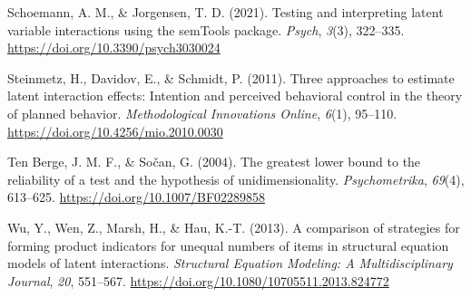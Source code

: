 \documentclass[
  man]{apa6}
\newlength{\cslhangindent}
\newenvironment{CSLReferences}[2] %
 {\begin{list}{}{%
  \setlength{\itemindent}{0pt}
  \setlength{\leftmargin}{0pt}
  \setlength{\parsep}{0pt}
  \ifodd #1
   \setlength{\leftmargin}{\cslhangindent}
   \setlength{\itemindent}{-1\cslhangindent}
  \fi
  \setlength{\itemsep}{#2\baselineskip}}}
 {\end{list}}
\begin{document}
\begin{CSLReferences}{1}{0}
Schoemann, A. M., \& Jorgensen, T. D. (2021). Testing and interpreting latent variable interactions using the {semTools} package. \emph{Psych}, \emph{3}(3), 322--335. \url{https://doi.org/10.3390/psych3030024}

Steinmetz, H., Davidov, E., \& Schmidt, P. (2011). Three approaches to estimate latent interaction effects: {Intention} and perceived behavioral control in the theory of planned behavior. \emph{Methodological Innovations Online}, \emph{6}(1), 95--110. \url{https://doi.org/10.4256/mio.2010.0030}

Ten Berge, J. M. F., \& Sočan, G. (2004). The greatest lower bound to the reliability of a test and the hypothesis of unidimensionality. \emph{Psychometrika}, \emph{69}(4), 613--625. \url{https://doi.org/10.1007/BF02289858}

Wu, Y., Wen, Z., Marsh, H., \& Hau, K.-T. (2013). A comparison of strategies for forming product indicators for unequal numbers of items in structural equation models of latent interactions. \emph{Structural Equation Modeling: A Multidisciplinary Journal}, \emph{20}, 551--567. \url{https://doi.org/10.1080/10705511.2013.824772}

\end{CSLReferences}
\end{document}
